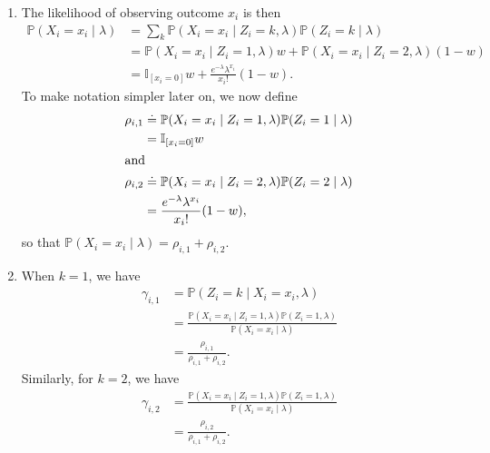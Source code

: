 \documentclass{article}
\begin{document}
\begin{enumerate}
	\item The likelihood of observing outcome $x_i$ is then
		\begin{align*}
			\mathbb{P}(X_i = x_i \;|\; \lambda) &= \sum_k \mathbb{P}(X_i=x_i \;|\; Z_i=k, \lambda) \mathbb{P}(Z_i=k \;|\; \lambda) \\
							    &= \mathbb{P}(X_i =x_i \;|\; Z_i=1, \lambda) w + \mathbb{P}(X_i=x_i \;|\; Z_i=2,\lambda) (1-w) \\
							    &= \mathbb{I}_{[x_i=0]}w + \frac{e^{-\lambda}\lambda^{x_i}}{x_i!} (1-w).
		\end{align*}
		To make notation simpler later on, we now define
		\begin{align*}
			\rho_{i,1} &\doteq \mathbb{P}(X_i=x_i \;|\; Z_i=1, \lambda) \mathbb{P}(Z_i=1 \;|\; \lambda) \\
				   &= \mathbb{I}_{[x_i=0]}w \\
				   \intertext{and}
			\rho_{i,2} &\doteq \mathbb{P}(X_i=x_i \;|\; Z_i=2, \lambda) \mathbb{P}(Z_i=2 \;|\; \lambda) \\
				   &= \frac{e^{-\lambda}\lambda^{x_i}}{x_i!} (1-w),
		\end{align*}
		so that $\mathbb{P}(X_i=x_i \;|\; \lambda) = \rho_{i,1} + \rho_{i,2}$.

	\item
		When $k=1$, we have
		\begin{align*}
			\gamma_{i,1} &= \mathbb{P}(Z_i=k \;|\; X_i=x_i, \lambda) \\
				     &= \frac{\mathbb{P}(X_i=x_i \;|\; Z_i=1, \lambda) \mathbb{P}(Z_i=1,\lambda) }{\mathbb{P}(X_i=x_i \;|\; \lambda) } \\
				     &= \frac{\rho_{i,1}}{\rho_{i,1} + \rho_{i,2}} .
		\end{align*}
		Similarly, for $k=2$, we have
		\begin{align*}
			\gamma_{i,2} &= \frac{\mathbb{P}(X_i=x_i \;|\; Z_i=1, \lambda) \mathbb{P}(Z_i=1,\lambda) }{\mathbb{P}(X_i=x_i \;|\; \lambda) } \\
				     &= \frac{\rho_{i,2}}{\rho_{i,1} + \rho_{i,2}} .
		\end{align*}


\end{enumerate}
\end{document}
